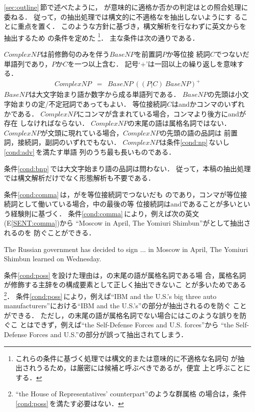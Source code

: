 \ref{sec:outline}\,節で述べたように，
{\CPNP}が意味的に適格か否かの判定は{\MTNP}と{\JNP}の照合処理に委ねる．
従って，{\CPNP}の抽出処理では構文的に不適格な{\CPNP}を抽出しないようにす
ることに重点を置く．
このような方針に基づき，構文解析を行なわずに英文から{\CPNP}を抽出するため
の条件を定めた
\footnote{これらの条件に基づく処理では構文的または意味的に不適格な名詞句
が抽出されうるため，{\CPNP}は厳密には{\CPNP}候補と呼ぶべきであるが，便宜
上{\CPNP}と呼ぶことにする．}． 
主な条件は次の通りである．
\begin{COND}
\cond \label{cond:np}
{\CPNP}$ComplexNP$は前修飾句のみを伴う{\BPNP}$BaseNP$を前置詞$P$か等位接
続詞$C$でつないだ単語列であり，$P$か$C$を一つ以上含む．
記号`$+$'は一回以上の繰り返しを意味する．
\begin{eqnarray*}
ComplexNP &=& BaseNP\ ((P|C)\ BaseNP)^+
\end{eqnarray*}
\cond \label{cond:bnp}
{\BPNP}$BaseNP$は大文字始まり語か数字から成る単語列である．
$BaseNP$の先頭は小文字始まりの定/不定冠詞であってもよい．
\cond \label{cond:comma}
等位接続詞$C$はandかコンマのいずれかである．
{\CPNP}$ComplexNP$にコンマが含まれている場合，コンマより後方にandが存在
しなければならない．
\cond \label{cond:poss}
{\CPNP}$ComplexNP$の末尾の語は属格名詞ではない．
\cond \label{cond:adv}
{\CPNP}$ComplexNP$が文頭に現れている場合，$ComplexNP$の先頭の語の品詞は
前置詞，接続詞，副詞のいずれでもない．
\cond \label{cond:length}
{\CPNP}$ComplexNP$は条件\ref{cond:np}\,ないし\ref{cond:adv}\,を満たす単語
列のうち最も長いものである．
\end{COND}

条件\ref{cond:bnp}\,では大文字始まり語の品詞は問わない．
従って，本稿の{\CPNP}抽出処理では構文解析だけでなく形態解析も不要である．

条件\ref{cond:comma}\,は，{\CPNP}が{\BPNP}を等位接続詞でつないだも
のであり，コンマが等位接続詞として働いている場合，{\CPNP}中の最後の等
位接続詞はandであることが多いという経験則に基づく．
条件\ref{cond:comma}\,により，例えば次の英文(E\ref{SENT:comma})から
``Moscow in April, The Yomiuri Shimbun''が{\CPNP}として抽出されるのを
防ぐことができる．
\begin{SENT}
\sentE
The Russian government has decided to sign $\ldots$ in Moscow in April, 
The Yomiuri Shimbun learned on Wednesday. 
\label{SENT:comma}
\end{SENT}

条件\ref{cond:poss}\,を設けた理由は，{\CPNP}の末尾の語が属格名詞である場
合，属格名詞が修飾する主辞を{\CPNP}の構成要素として正しく抽出できないこ
とが多いためである
\footnote{``the House of Representatives' counterpart''のような群属格
の場合は，条件\ref{cond:poss}\,を満たす必要はない．}．
条件\ref{cond:poss}\,により，例えば``IBM and the U.S.'s big three auto 
manufacturers''における``IBM and the U.S.'s''の部分が抽出されるのを防ぐ
ことができる．
ただし，{\CPNP}の末尾の語が属格名詞でない場合にはこのような誤りを防ぐこ
とはできず，例えば``the Self-Defense Forces and U.S. forces''から
``the Self-Defense Forces and U.S.''の部分が誤って抽出されてしまう．

